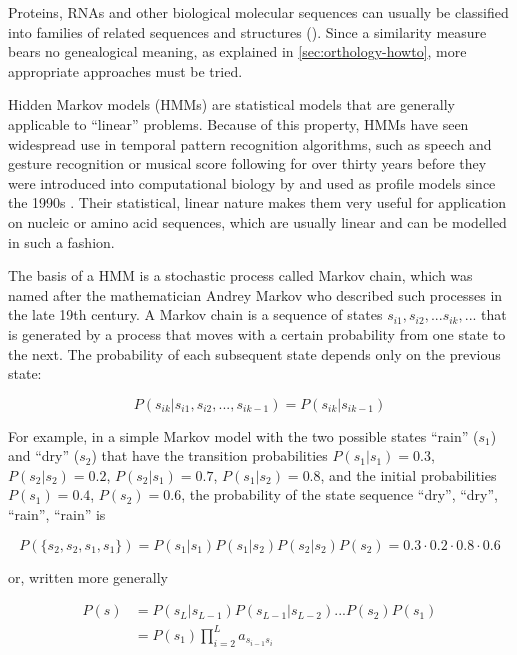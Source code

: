 \label{sec:hmms}
Proteins, RNAs and other biological molecular sequences can usually be
classified into families of related sequences and structures
(\cite{henikoff1997}). Since a similarity measure bears no genealogical meaning,
as explained in \autoref{sec:orthology-howto}, more appropriate approaches must
be tried.

Hidden Markov models (HMMs) are statistical models that are generally applicable
to ``linear'' problems. Because of this property, HMMs have seen widespread use
in temporal pattern recognition algorithms, such as speech and gesture
recognition or musical score following for over thirty years \citep{rabiner1989}
before they were introduced into computational biology by \citet{churchill1989}
and used as profile models since the 1990s \citep{krogh1994}. Their statistical,
linear nature makes them very useful for application on nucleic or amino acid
sequences, which are usually linear and can be modelled in such a fashion. 

The basis of a HMM is a stochastic process called Markov chain, which was named
after the mathematician Andrey Markov who described such processes in the late
19th century. A Markov chain is a sequence of states $s_{i1}, s_{i2}, ...
s_{ik}, ...$ that is generated by a process that moves with a certain probability
from one state to the next. The probability of each subsequent state depends
only on the previous state:

\begin{equation}
P(s_{ik} | s_{i1}, s_{i2}, ..., s_{ik-1}) = P(s_{ik} | s_{ik-1})
\label{eqn:markov-chain}
\end{equation}

For example, in a simple Markov model with the two possible states ``rain''
($s_1$) and ``dry'' ($s_2$) that have the transition probabilities $P(s_1|s_1) =
0.3$, $P(s_2|s_2) = 0.2$, $P(s_2|s_1) = 0.7$, $P(s_1|s_2) = 0.8$, and the
initial probabilities $P(s_1) = 0.4$, $P(s_2) = 0.6$, the probability of the
state sequence ``dry'', ``dry'', ``rain'', ``rain'' is

\begin{equation}
P(\{s_2, s_2, s_1, s_1\}) = P(s_1|s_1) P(s_1|s_2) P(s_2|s_2) P(s_2) = 0.3 \cdot 0.2 \cdot 0.8 \cdot 0.6
\label{eqn:markov-chain-weather}
\end{equation}

or, written more generally

\begin{equation}
	\begin{split}
		P(s) &= P(s_L|s_{L-1}) P(s_{L-1}|s_{L-2}) . . . P(s_2) P(s_1) \\
		&= P(s_1) \prod^{L}_{i=2}a_{s_{i-1}s_{i}}
	\end{split}
	\label{eqn:markov-chain-general}
\end{equation}

